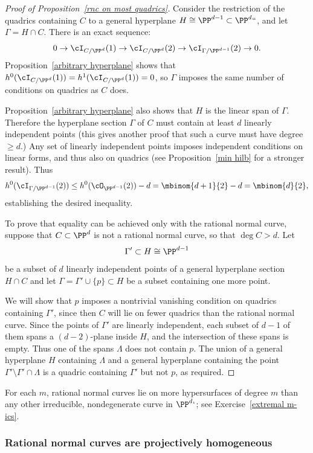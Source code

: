 \begin{proof}[Proof of Proposition~\ref{rnc on most quadrics}]
Consider the restriction of the quadrics containing $C$ to a general hyperplane $H \cong \PP^{d-1} \subset \PP^d` `$, and let $\Gamma = H \cap C$. There is an exact sequence:
$$
0 \to \cI_{C/\PP^d}(1) \to \cI_{C/\PP^d}(2) \to \cI_{\Gamma/\PP^{d-1}}(2) \to 0.
$$ 
Proposition~\ref{arbitrary hyperplane} shows that $h^0(\cI_{C/\PP^d}(1)) = h^1(\cI_{C/\PP^d}(1))=0$, so $\Gamma$
imposes the same number of conditions on quadrics as $C$ does.

Proposition~\ref{arbitrary hyperplane} also shows that $H$ is the
\vadjust{\allowbreak}%
linear span of  $\Gamma$. 
Therefore
the hyperplane section $\Gamma$ of $C$ must contain at least $d$
linearly independent points (this gives another proof that 
such a curve must have degree $\geq d$.)
Any set of linearly independent points imposes independent conditions on linear forms, and thus also on quadrics (see 
Proposition~\ref{min hilb} for a stronger result). 
Thus
$$
h^0(\cI_{\Gamma/\PP^{d-1}}(2)) \leq h^0(\cO_{\PP^{d-1}}(2)) - d = 
\mbinom{d+1}{2} - d = \mbinom{d}{2},
$$
establishing the desired inequality. 

To prove that 
equality can be achieved only with the rational normal curve, 
suppose that $C\subset \PP^{d}$
is not a rational normal curve, so that $\deg C >d$. Let
$$
\Gamma' \subset H \cong \PP^{d-1}
$$
be a subset 
of $d$ linearly independent points of a general hyperplane section $H\cap C$
and let $\Gamma = \Gamma'\cup\{p\}\subset H$ be a subset containing one more point.

We will
show that $p$ imposes a nontrivial vanishing condition on quadrics containing $\Gamma'$, since
then $C$ 
will lie
on fewer quadrics than the rational normal curve.
Since the points of $\Gamma'$ are linearly independent, each subset of
$d{-}1$ of them spans a $(d{-}2)$-plane inside $H$, and the intersection
of these spans is empty. Thus one of the spans $\Lambda$ does not
contain $p$. 
The union of  a general hyperplane $H$ containing $\Lambda$ and a general hyperplane containing 
the point $\Gamma' \setminus \Gamma'\cap \Lambda$
is a quadric containing $\Gamma'$ but not $p$, as required. 
\unif
\end{proof}

For each $m$, rational normal curves lie on more hypersurfaces of degree $m$ than any other irreducible, nondegenerate curve in $\PP^d`$; see Exercise~\ref{extremal m-ics}.

\subsubsection*{Rational normal curves are projectively homogeneous}

